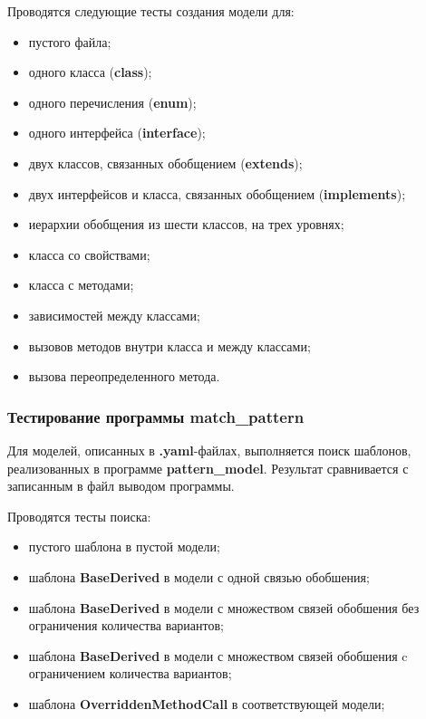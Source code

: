 Проводятся следующие тесты создания модели для:
\begin{itemize}
\item пустого файла;
\item одного класса (\textbf{class});
\item одного перечисления (\textbf{enum});
\item одного интерфейса (\textbf{interface});
\item двух классов, связанных обобщением (\textbf{extends});
\item двух интерфейсов и класса, связанных обобщением (\textbf{implements});
\item иерархии обобщения из шести классов, на трех уровнях;
\item класса со свойствами;
\item класса с методами;
\item зависимостей между классами;
\item вызовов методов внутри класса и между классами;
\item вызова переопределенного метода.
\end{itemize}

\subsubsection{Тестирование программы match\_pattern}

Для моделей, описанных в \textbf{.yaml}-файлах, выполняется поиск шаблонов,
реализованных в программе \textbf{pattern\_model}.
Результат сравнивается с записанным в файл выводом программы.

Проводятся тесты поиска:
\begin{itemize}
\item пустого шаблона в пустой модели;
\item шаблона \textbf{BaseDerived} в модели с одной связью обобшения;
\item шаблона \textbf{BaseDerived} в модели с множеством связей обобшения
без ограничения количества вариантов;
\item шаблона \textbf{BaseDerived} в модели с множеством связей обобшения
c ограничением количества вариантов;
\item шаблона \textbf{OverriddenMethodCall} в соответствующей модели;
\end{itemize}
